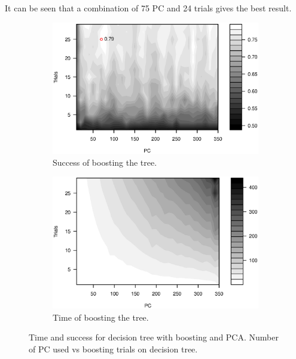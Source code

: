 It can be seen that a combination of 75 PC and 24 trials gives the best result.

\begin{figure}[H]
\centering
    \begin{subfigure}[t]{0.49\textwidth}
        \includegraphics[width=\textwidth]{graphics/tree_pca_vs_boost_success}
        \caption{Success of boosting the tree.}
        \label{fig:tree_pca_boost}
    \end{subfigure}
    \begin{subfigure}[t]{0.49\textwidth}
        \includegraphics[width=\textwidth]{graphics/tree_pca_vs_boost_time}
        \caption{Time of boosting the tree.}
        \label{fig:tree_pca_boost_timing}
    \end{subfigure}
\caption[Time and success for decision tree with boosting and PCA.]{
Time and success for decision tree with boosting and PCA. Number of PC used vs boosting trials on decision tree.}
\label{fig:tree_pca_boost}
\end{figure}

